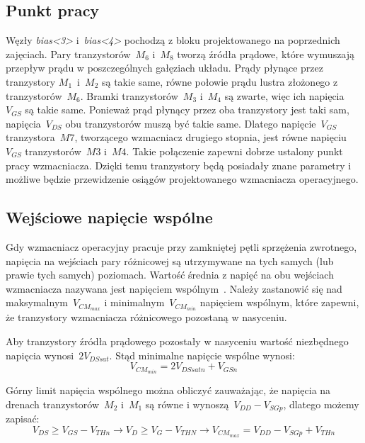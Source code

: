 \documentclass[twoside,pl,final]{labman}
\begin{document}
\subsection{Punkt pracy}
\label{schematic:op}
Węzły \emph{bias<3>} i~\emph{bias<4>} pochodzą z bloku
projektowanego na poprzednich zajęciach.
Pary tranzystorów~$M_6$ i~$M_8$ tworzą źródła prądowe,
które wymuszają przepływ prądu w poszczególnych gałęziach układu.
Prądy płynące przez tranzystory $M_1$~i~$M_2$ są takie same,
równe połowie prądu lustra złożonego z tranzystorów~$M_6$.
Bramki tranzystorów~$M_3$ i~$M_4$ są zwarte,
więc ich napięcia~$V_{GS}$ są takie same.
Ponieważ prąd płynący przez oba tranzystory jest taki sam,
napięcia~$V_{DS}$ obu tranzystorów muszą być takie same.
Dlatego napięcie~$V_{GS}$ tranzystora~$M7$,
tworzącego wzmacniacz drugiego stopnia,
jest równe napięciu~$V_{GS}$ tranzystorów~$M3$ i~$M4$.
Takie połączenie zapewni dobrze ustalony punkt pracy wzmacniacza.
Dzięki temu tranzystory będą posiadały znane parametry i możliwe
będzie przewidzenie osiągów projektowanego wzmacniacza operacyjnego.

\subsection{Wejściowe napięcie wspólne}
\label{schematic:cm}
Gdy wzmacniacz operacyjny pracuje przy
zamkniętej pętli sprzężenia zwrotnego,
napięcia na wejściach pary różnicowej są utrzymywane na tych samych
(lub prawie tych samych) poziomach.
Wartość średnia z napięć na obu wejściach wzmacniacza
nazywana jest napięciem wspólnym~.
Należy zastanowić się nad maksymalnym~$V_{CM_{max}}$ i
minimalnym~$V_{CM_{min}}$ napięciem wspólnym, które zapewni,
że tranzystory wzmacniacza różnicowego pozostaną w nasyceniu.

Aby tranzystory źródła prądowego pozostały w nasyceniu
wartość niezbędnego napięcia wynosi~$2V_{DSsat}$.
Stąd minimalne napięcie wspólne wynosi:
\begin{equation}
  V_{CM_{min}} = 2V_{DSsatn} + V_{GSn}
\end{equation}

Górny limit napięcia wspólnego można obliczyć zauważając,
że napięcia na drenach tranzystorów~$M_2$ i~$M_1$ są równe i wynoszą~$V_{DD} - V_{SGp}$,
dlatego możemy zapisać:
\begin{equation}
  V_{DS} \geq V_{GS} - V_{THn} \rightarrow
  V_D \geq V_G - V_{THN} \rightarrow
  V_{CM_{max}} = V_{DD} - V_{SGp} + V_{THn}
\end{equation}
\end{document}
